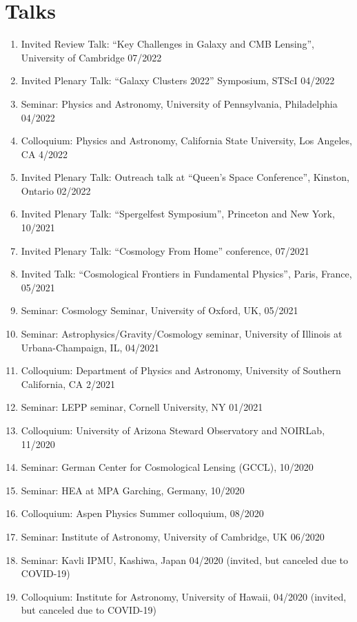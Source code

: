 \section{Talks}

\begin{enumerate}
  \item Invited Review Talk: ``Key Challenges in Galaxy and CMB Lensing'', University of Cambridge 07/2022
  \item Invited Plenary Talk: ``Galaxy Clusters 2022'' Symposium, STScI 04/2022 
  \item Seminar: Physics and Astronomy, University of Pennsylvania, Philadelphia 04/2022
  \item Colloquium: Physics and Astronomy, California State University, Los Angeles, CA 4/2022 
  \item Invited Plenary Talk: Outreach talk at ``Queen's Space Conference'', Kinston, Ontario 02/2022 
  \item Invited Plenary Talk: ``Spergelfest Symposium'', Princeton and New York, 10/2021
  \item Invited Plenary Talk: ``Cosmology From Home'' conference, 07/2021 
  \item Invited Talk: ``Cosmological Frontiers in Fundamental Physics'', Paris, France, 05/2021 
  \item Seminar: Cosmology Seminar, University of Oxford, UK, 05/2021 
  \item Seminar: Astrophysics/Gravity/Cosmology seminar, University of Illinois at Urbana-Champaign, IL, 04/2021 
  \item Colloquium: Department of Physics and Astronomy, University of Southern California, CA 2/2021 
  \item Seminar: LEPP seminar, Cornell University, NY 01/2021 
  \item Colloquium: University of Arizona Steward Observatory and NOIRLab, 11/2020 
  \item Seminar: German Center for Cosmological Lensing (GCCL), 10/2020 
  \item Seminar: HEA at MPA Garching, Germany, 10/2020 
  \item Colloquium: Aspen Physics Summer colloquium, 08/2020 
  \item Seminar: Institute of Astronomy, University of Cambridge, UK 06/2020 
  \item Seminar: Kavli IPMU, Kashiwa, Japan 04/2020 (invited, but canceled due to COVID-19)
  \item Colloquium: Institute for Astronomy, University of Hawaii, 04/2020 (invited, but canceled due to COVID-19)

\end{enumerate}
